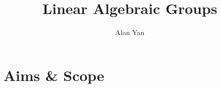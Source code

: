 \documentclass[]{pcmi}
\theoremstyle{plain}
\theoremstyle{definition}
\begin{document}
%
%
%
%
%
%

\title[linear algebraic groups]{Linear Algebraic Groups} 

%    
%    
\author{Alan Yan}
\date{} 
\address{}
\email{}

\keywords{}

%    
%    
\maketitle

\tableofcontents

%    
%    



\section{Aims \& Scope} 
\end{document}
